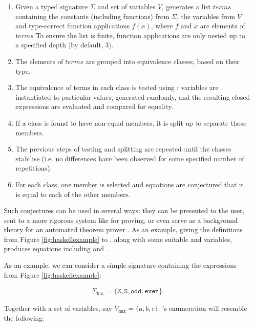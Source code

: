\begin{enumerate}
  \item Given a typed signature $\Sigma$ and set of variables $V$, \qspec{} generates a list $terms$ containing the constants (including functions) from $\Sigma$, the variables from $V$ and type-correct function applications $f(x)$, where $f$ and $x$ are elements of $terms$
To ensure the list is finite, function applications are only nested up to a specified depth (by default, 3).
  \item The elements of $terms$ are grouped into equivalence classes, based on their type.
  \item The equivalence of terms in each class is tested using \qcheck{}: variables are instantiated to particular values, generated randomly, and the resulting closed expressions are evaluated and compared for equality.
  \item If a class is found to have non-equal members, it is split up to separate those members.
  \item The previous steps of testing and splitting are repeated until the classes stabilise (i.e. no differences have been observed for some specified number of repetitions).
  \item For each class, one member is selected and equations are conjectured that it is equal to each of the other members.
\end{enumerate}

Such conjectures can be used in several ways: they can be presented to the user, sent to a more rigorous system like \hspec{} for proving, or even serve as a background theory for an automated theorem prover \cite{claessen2013automating}. As an example, giving the definitions from Figure \ref{fig:haskellexample} to \qspec{}. along with some suitable  and  variables, produces equations including  and .

\iffalse
As an example, we can consider a simple signature containing the expressions from Figure \ref{fig:haskellexample}:

\begin{align*}
  \Sigma_{\texttt{Nat}} = \{\texttt{Z}, \texttt{S}, \texttt{odd}, \texttt{even}\}
\end{align*}

Together with a set of variables, say $V_{\texttt{Nat}} = \{a, b, c\}$, \qspec{}'s enumeration will resemble the following:

